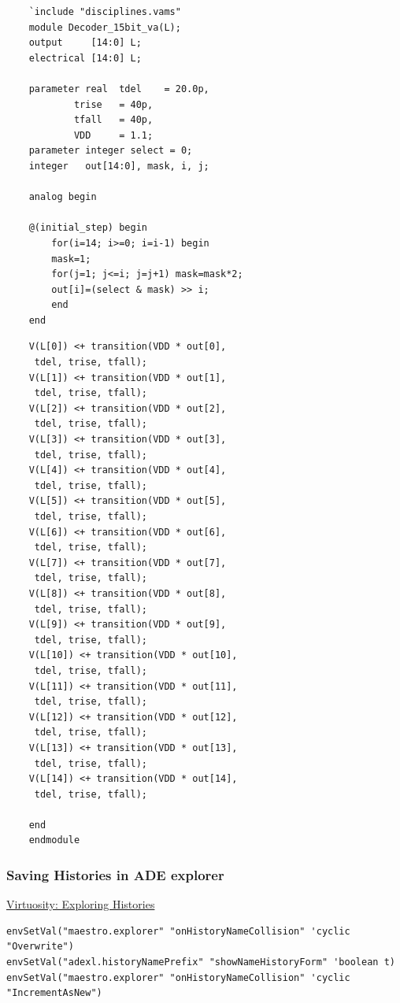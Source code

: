 \begin{file}
	\begin{lstlisting}
	`include "disciplines.vams"
	module Decoder_15bit_va(L);
	output     [14:0] L;
	electrical [14:0] L;

	parameter real 	tdel 	= 20.0p,
			trise	= 40p,
			tfall	= 40p,
			VDD 	= 1.1;
	parameter integer select = 0;
	integer   out[14:0], mask, i, j;

	analog begin
	
	@(initial_step) begin
		for(i=14; i>=0; i=i-1) begin
		mask=1;
		for(j=1; j<=i; j=j+1) mask=mask*2;
		out[i]=(select & mask) >> i;
		end
	end
	\end{lstlisting}
\end{file}

\begin{file}
	\begin{lstlisting}
	V(L[0]) <+ transition(VDD * out[0],
	 tdel, trise, tfall);
	V(L[1]) <+ transition(VDD * out[1],
	 tdel, trise, tfall);
	V(L[2]) <+ transition(VDD * out[2],
	 tdel, trise, tfall);
	V(L[3]) <+ transition(VDD * out[3],
	 tdel, trise, tfall);
	V(L[4]) <+ transition(VDD * out[4],
	 tdel, trise, tfall);
	V(L[5]) <+ transition(VDD * out[5],
	 tdel, trise, tfall);
	V(L[6]) <+ transition(VDD * out[6],
	 tdel, trise, tfall);
	V(L[7]) <+ transition(VDD * out[7],
	 tdel, trise, tfall);
	V(L[8]) <+ transition(VDD * out[8],
	 tdel, trise, tfall);
	V(L[9]) <+ transition(VDD * out[9],
	 tdel, trise, tfall);
	V(L[10]) <+ transition(VDD * out[10],
	 tdel, trise, tfall);
	V(L[11]) <+ transition(VDD * out[11],
	 tdel, trise, tfall);
	V(L[12]) <+ transition(VDD * out[12],
	 tdel, trise, tfall);
	V(L[13]) <+ transition(VDD * out[13],
	 tdel, trise, tfall);
	V(L[14]) <+ transition(VDD * out[14],
	 tdel, trise, tfall);

	end  
	endmodule
	\end{lstlisting}
\end{file}

\newpage

\subsubsection*{Saving Histories in ADE explorer}

\href{https://community.cadence.com/cadence_blogs_8/b/cic/posts/virtuosity-exploring-histories}{Virtuosity: Exploring Histories}
\begin{verbatim}
envSetVal("maestro.explorer" "onHistoryNameCollision" 'cyclic "Overwrite")
envSetVal("adexl.historyNamePrefix" "showNameHistoryForm" 'boolean t)
envSetVal("maestro.explorer" "onHistoryNameCollision" 'cyclic "IncrementAsNew")
\end{verbatim}

